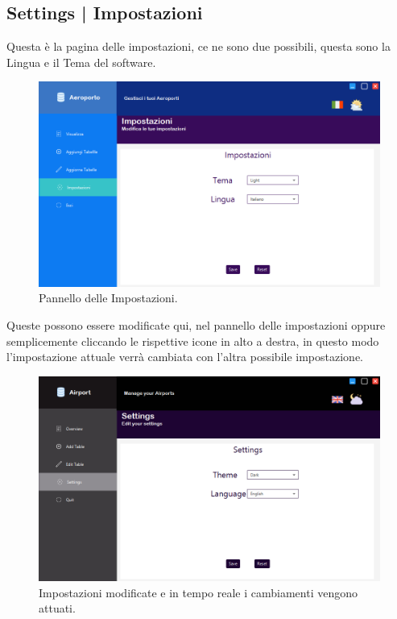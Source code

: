 
\newpage

\enlargethispage{1\linewidth}

\subsection{Settings | Impostazioni}

\textsf{\small Questa è la pagina delle impostazioni, ce ne sono due possibili, questa sono la Lingua e il Tema del software.}

\begin{figure}[H] 
	\centering
	\includegraphics[width=1\textwidth, height=1\textheight, keepaspectratio]{./img/Applicativo/settings.png}
	\caption{Pannello delle Impostazioni.}
	\label{fig:settings1}
\end{figure}

\textsf{\small Queste possono essere modificate qui, nel pannello delle impostazioni oppure semplicemente cliccando le rispettive icone in alto a destra, in questo modo l'impostazione attuale verrà cambiata con l'altra possibile impostazione.}

\begin{figure}[H] 
	\centering
	\includegraphics[width=1\textwidth, height=1\textheight, keepaspectratio]{./img/Applicativo/settings_change_language_and_theme.png}
	\caption{Impostazioni modificate e in tempo reale i cambiamenti vengono attuati.}
	\label{fig:settings2}
\end{figure}

